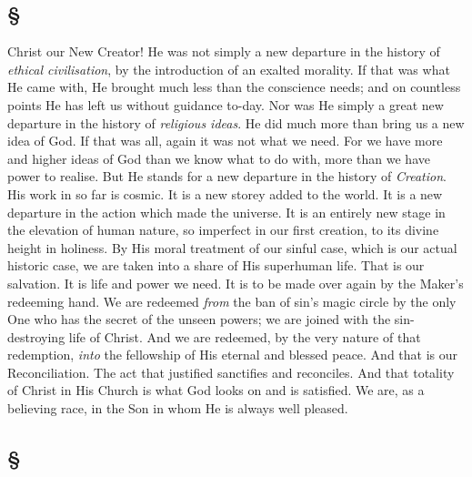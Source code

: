 \documentclass[draft]{ptfdoc}
\begin{document}
\subsection*{
\S
}

Christ our New Creator! He was not simply 
a new departure in the history of \textit{ethical civilisation}, 
by the introduction of an exalted morality. 
If that was what He came with, He brought much 
less than the conscience needs; and on countless 
points He has left us without guidance to-day. 
Nor was He simply a great new departure in the 
history of \textit{religious ideas}. He did much more 
than bring us a new idea of God. If that was 
all, again it was not what we need. For we 
have more and higher ideas of God than we 
know what to do with, more than we have 
power to realise. But He stands for a new 
departure in the history of \textit{Creation}. His work 
in so far is cosmic. It is a new storey added to 
the world. It is a new departure in the action 
which made the universe. It is an entirely new 
stage in the elevation of human nature, so 
imperfect in our first creation, to its divine 
height in holiness. By His moral treatment of 
our sinful case, which is our actual historic case, 
we are taken into a share of His superhuman 
life. That is our salvation. It is life and power 
we need. It is to be made over again by the 
Maker's redeeming hand. We are redeemed 
\textit{from} the ban of sin's magic circle by the only 
One who has the secret of the unseen powers; 
we are joined with the sin-destroying life of 
Christ. And we are redeemed, by the very 
nature of that redemption, \textit{into} the fellowship of 
His eternal and blessed peace. And that is our 
Reconciliation. The act that justified sanctifies 
and reconciles. And that totality of Christ in 
His Church is what God looks on and is satisfied. 
We are, as a believing race, in the Son in whom 
He is always well pleased. 

\subsection*{
\S
}
\end{document}
